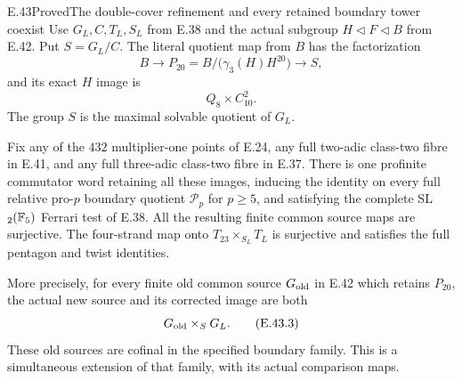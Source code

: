 \begin{statement}{E.43}{Proved}{The double-cover refinement and every retained boundary tower coexist}
Use $G_L,C,T_L,S_L$ from E.38 and the actual subgroup
$H\lhd F\lhd B$ from E.42.  Put $S=G_L/C$.
The literal quotient map from $B$ has the factorization
\[
 B\longrightarrow P_{20}=B/\bigl(\gamma_3(H)H^{20}\bigr)
                  \longrightarrow S,
 \tag{E.43.1}
\]
and its exact $H$ image is
\[
                 Q_8\times C_{10}^2.
 \tag{E.43.2}
\]
The group $S$ is the maximal solvable quotient of $G_L$.

Fix any of the $432$ multiplier-one points of E.24,
any full two-adic class-two fibre in E.41, and any
full three-adic class-two fibre in E.37.  There is one
profinite commutator word retaining all these images,
inducing the identity on every full relative pro-$p$
boundary quotient $\mathscr P_p$ for $p\ge5$, and
satisfying the complete SL$_2(\mathbb F_5)$ Ferrari test
of E.38.  All the resulting finite common source
maps are surjective.  The four-strand map onto
$T_{23}\times_{S_L}T_L$ is surjective and satisfies
the full pentagon and twist identities.

More precisely, for every finite old common source
$G_{\rm old}$ in E.42 which retains $P_{20}$, the
actual new source and its corrected image are both
\[
                    G_{\rm old}\times_S G_L.
 \tag{E.43.3}
\]
These old sources are cofinal in the specified
boundary family.  This is a simultaneous extension
of that family, with its actual comparison maps.
\end{statement}
